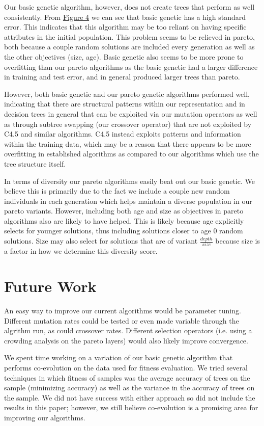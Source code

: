 \documentclass{acm_proc_article-sp}
\begin{document}
Our basic genetic algorithm, however, does not create trees that perform as well consistently. From \hyperref[algorithms]{Figure 4} we can see that basic genetic has a high standard error. This indicates that this algorithm may be too reliant on having specific attributes in the initial population. This problem seems to be relieved in pareto, both because a couple random solutions are included every generation as well as the other objectives (size, age). Basic genetic also seems to be more prone to overfitting than our pareto algorithms as the basic genetic had a larger difference in training and test error, and in general produced larger trees than pareto.

However, both basic genetic and our pareto genetic algorithms performed well, indicating that there are structural patterns within our representation and in decision trees in general that can be exploited via our mutation operators as well as through subtree swapping (our crossover operator) that are not exploited by C4.5 and similar algorithms. C4.5 instead exploits patterns and information within the training data, which may be a reason that there appears to be more overfitting in established algorithms as compared to our algorithms which use the tree structure itself.

In terms of diversity our pareto algorithms easily beat out our basic genetic. We believe this is primarily due to the fact we include a couple new random individuals in each generation which helps maintain a diverse population in our pareto variants. However, including both age and size as objectives in pareto algorithms also are likely to have helped. This is likely because age explicitly selects for younger solutions, thus including solutions closer to age 0 random solutions. Size may also select for solutions that are of variant $\frac{depth}{size}$ because size is a factor in how we determine this diversity score.

\section{Future Work}
An easy way to improve our current algorithms would be parameter tuning. Different mutation rates could be tested or even made variable through the algrithm run, as could crossover rates. Different selection operators (i.e. using a crowding analysis on the pareto layers) would also likely improve convergence.

We spent time working on a variation of our basic genetic algorithm that performs co-evolution on the data used for fitness evaluation. We tried several techniques in which fitness of samples was the average accuracy of trees on the sample (minimizing accuracy) as well as the variance in the accuracy of trees on the sample. We did not have success with either approach so did not include the results in this paper; however, we still believe co-evolution is a promising area for improving our algorithms.
\end{document}
